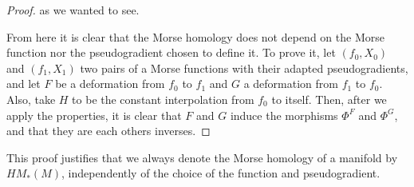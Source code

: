 \begin{proof}
as we wanted to see.

From here it is clear that the Morse homology does not depend on the Morse function nor the pseudogradient chosen to define it. To prove it, let $(f_0,X_0)$ and $(f_1,X_1)$ two pairs of a Morse functions with their adapted pseudogradients, and let $F$ be a deformation from $f_0$ to $f_1$ and $G$ a deformation from $f_1$ to $f_0$. Also, take $H$ to be the constant interpolation from $f_0$ to itself. Then, after we apply the properties, it is clear that $F$ and $G$ induce the morphisms $\Phi^F$ and $\Phi^G$, and that they are each others inverses.
\end{proof}

\begin{rmrk}
This proof justifies that we always denote the Morse homology of a manifold by $HM_{\ast}(M)$, independently of the choice of the function and pseudogradient.
\end{rmrk}